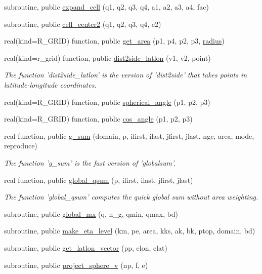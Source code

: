 \begin{DoxyCompactItemize}
\item 
subroutine, public \hyperlink{classfv__grid__utils__mod_ab160a0e2cf47c2dfc388760a5ef44088}{expand\-\_\-cell} (q1, q2, q3, q4, a1, a2, a3, a4, fac)
\item 
subroutine, public \hyperlink{classfv__grid__utils__mod_acd269ab71691330f8b1abd0f3d939b8f}{cell\-\_\-center2} (q1, q2, q3, q4, e2)
\item 
real(kind=R\-\_\-\-G\-R\-I\-D) function, public \hyperlink{classfv__grid__utils__mod_a8feb2769227e59666678485759eaa734}{get\-\_\-area} (p1, p4, p2, p3, \hyperlink{classfv__grid__utils__mod_a9825bfea45f13a48cc658a3df88d3124}{radius})
\item 
real(kind=r\-\_\-grid) function, public \hyperlink{classfv__grid__utils__mod_a585eb851f9d447a4cad1f7787885cf95}{dist2side\-\_\-latlon} (v1, v2, point)
\begin{DoxyCompactList}\small\item\em The function 'dist2side\-\_\-latlon' is the version of 'dist2side' that takes points in latitude-\/longitude coordinates. \end{DoxyCompactList}\item 
real(kind=R\-\_\-\-G\-R\-I\-D) function, public \hyperlink{classfv__grid__utils__mod_a917846d8ea59488d86f6c1915005fa6d}{spherical\-\_\-angle} (p1, p2, p3)
\item 
real(kind=R\-\_\-\-G\-R\-I\-D) function, public \hyperlink{classfv__grid__utils__mod_aac790b318f173e5ae56e8c4693342ced}{cos\-\_\-angle} (p1, p2, p3)
\item 
real function, public \hyperlink{classfv__grid__utils__mod_acf53e76b1bc9e689efe4900919cd05ef}{g\-\_\-sum} (domain, p, ifirst, ilast, jfirst, jlast, ngc, area, mode, reproduce)
\begin{DoxyCompactList}\small\item\em The function 'g\-\_\-sum' is the fast version of 'globalsum'. \end{DoxyCompactList}\item 
real function, public \hyperlink{classfv__grid__utils__mod_acb84df3b3d185ec7c0158eb595fb61e2}{global\-\_\-qsum} (p, ifirst, ilast, jfirst, jlast)
\begin{DoxyCompactList}\small\item\em The function 'global\-\_\-qsum' computes the quick global sum without area weighting. \end{DoxyCompactList}\item 
subroutine, public \hyperlink{classfv__grid__utils__mod_acfadec31f0ae9c244867d2055922ad81}{global\-\_\-mx} (q, n\-\_\-g, qmin, qmax, bd)
\item 
subroutine, public \hyperlink{classfv__grid__utils__mod_a160d6add1771f6ad1b64c0ec5f46e053}{make\-\_\-eta\-\_\-level} (km, pe, area, kks, ak, bk, ptop, domain, bd)
\item 
subroutine, public \hyperlink{classfv__grid__utils__mod_a6a6f485efd42e62b7eeb21509b0200cf}{get\-\_\-latlon\-\_\-vector} (pp, elon, elat)
\item 
subroutine, public \hyperlink{classfv__grid__utils__mod_aad0953473a601f3e18b5d6301b6fae17}{project\-\_\-sphere\-\_\-v} (np, f, e)
\end{DoxyCompactItemize}
